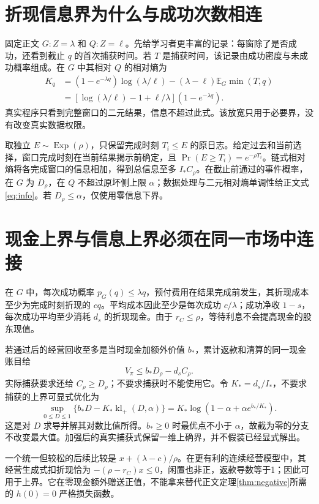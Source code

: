 \documentclass[UTF8,fontset=windows,11pt,a4paper]{ctexart}
\numberwithin{equation}{section}
\begin{document}
\appendix
\section{折现信息界为什么与成功次数相连}
固定正文 $G:Z=\lambda$ 和 $Q:Z=\ell$。先给学习者更丰富的记录：每窗除了是否成功，还看到截止 $q$ 的首次捕获时间。若 $T$ 是捕获时间，该记录由成功密度与未成功概率组成。在 $G$ 中其相对 $Q$ 的相对熵为
\begin{align}
 K_q&=(1-e^{-\lambda q})\log(\lambda/\ell)
 -(\lambda-\ell)\mathbb E_G\min(T,q)\\
 &=\left[\log(\lambda/\ell)-1+\ell/\lambda\right](1-e^{-\lambda q}).
\end{align}
真实程序只看到完整窗口的二元结果，信息不超过此式。该放宽只用于必要界，没有改变真实数据权限。

取独立 $E\sim\operatorname{Exp}(\rho)$，只保留完成时刻 $T_i\le E$ 的原日志。给定过去和当前选择，窗口完成时刻在当前结果揭示前确定，且 $\Pr(E\ge T_i)=e^{-\rho T_i}$。链式相对熵将各完成窗口的信息相加，得到总信息至多 $I_*C_\rho$。在截止前通过的事件概率，在 $G$ 为 $D_\rho$，在 $Q$ 不超过原坏侧上限 $\alpha$；数据处理与二元相对熵单调性给正文式\eqref{eq:info}。若 $D_\rho\le\alpha$，仅使用零信息下界。

\section{现金上界与信息上界必须在同一市场中连接}
在 $G$ 中，每次成功概率 $p_G(q)\le\lambda q$，预付费用在结果完成前发生，其折现成本至少为完成时刻折现的 $cq$。平均成本因此至少是每次成功 $c/\lambda$；成功净收 $1-s$，每次成功平均至少消耗 $d_s$ 的折现现金。由于 $r_C\le\rho$，等待利息不会提高现金的股东现值。

若通过后的经营回收至多是当时现金加额外价值 $b_*$，累计返款和清算的同一现金账目给
\begin{equation}
 V_\pi\le b_*D_\rho-d_s C_\rho.
\end{equation}
实际捕获要求还给 $C_\rho\ge D_\rho$；不要求捕获时不能使用它。令 $K_*=d_s/I_*$，不要求捕获的上界可显式优化为
\begin{equation}
 \sup_{0\le D\le1}\{b_*D-K_*\operatorname{kl}_+(D,\alpha)\}
 =K_*\log(1-\alpha+\alpha e^{b_*/K_*}).
\end{equation}
这是对 $D$ 求导并解其对数比值所得。$b_*\ge0$ 时最优点不小于 $\alpha$，故截为零的分支不改变最大值。加强后的真实捕获式保留一维上确界，并不假装已经显式解出。

一个统一但较松的后续比较是 $x+(\lambda-c)/\rho$。在更有利的连续经营模型中，其经营生成式扣折现恰为 $-(\rho-r_C)x\le0$，闲置也非正，返款导数等于1；因此可用于上界。它在零现金额外赠送正值，不能拿来替代正文定理\ref{thm:negative}所需的 $h(0)=0$ 严格损失函数。
\end{document}
